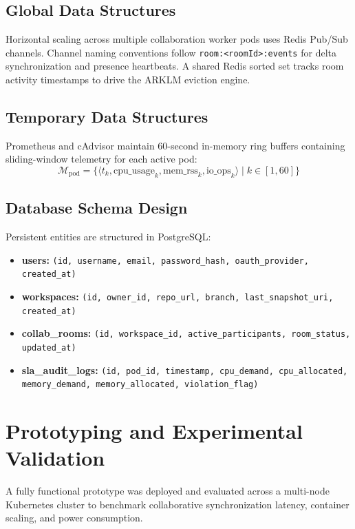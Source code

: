 \documentclass[12pt,a4paper]{report}
\begin{document}
\subsection{Global Data Structures}
Horizontal scaling across multiple collaboration worker pods uses Redis Pub/Sub channels. Channel naming conventions follow \texttt{room:<roomId>:events} for delta synchronization and presence heartbeats. A shared Redis sorted set tracks room activity timestamps to drive the ARKLM eviction engine.

\subsection{Temporary Data Structures}
Prometheus and cAdvisor maintain 60-second in-memory ring buffers containing sliding-window telemetry for each active pod:
\begin{equation}
    \mathcal{M}_{\text{pod}} = \{\langle t_k, \text{cpu\_usage}_k, \text{mem\_rss}_k, \text{io\_ops}_k \rangle \mid k \in [1, 60]\}
\end{equation}

\subsection{Database Schema Design}
Persistent entities are structured in PostgreSQL:
\begin{itemize}
    \item \textbf{users:} \texttt{(id, username, email, password\_hash, oauth\_provider, created\_at)}
    \item \textbf{workspaces:} \texttt{(id, owner\_id, repo\_url, branch, last\_snapshot\_uri, created\_at)}
    \item \textbf{collab\_rooms:} \texttt{(id, workspace\_id, active\_participants, room\_status, updated\_at)}
    \item \textbf{sla\_audit\_logs:} \texttt{(id, pod\_id, timestamp, cpu\_demand, cpu\_allocated, memory\_demand, memory\_allocated, violation\_flag)}
\end{itemize}

\section{Prototyping and Experimental Validation}
A fully functional prototype was deployed and evaluated across a multi-node Kubernetes cluster to benchmark collaborative synchronization latency, container scaling, and power consumption.
\end{document}
